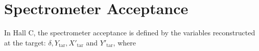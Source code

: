 \documentclass[12pt]{article}
\begin{document}
\maketitle


\section{\small Spectrometer Acceptance}
In Hall C, the spectrometer acceptance is defined by the variables reconstructed at the target: $\delta, Y_{\mathrm{tar}}, X'_{\mathrm{tar}}$ and $Y'_{\mathrm{tar}}$, where
\end{document}
